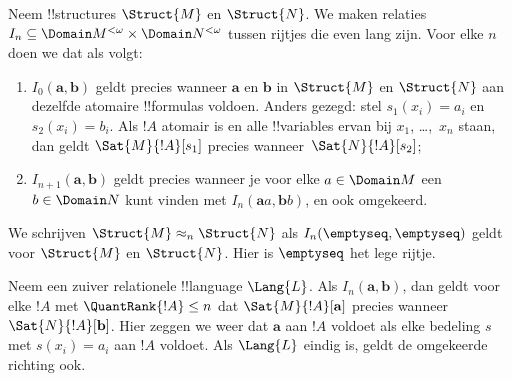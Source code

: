 \documentclass[openany]{memoir}
\begin{document}
\begin{defn}
  Neem !!{structure}s $\Struct{M}$ en $\Struct{N}$. We maken relaties
  $I_n \subseteq \Domain M^{<\omega} \times \Domain N^{<\omega}$
  tussen rijtjes die even lang zijn. Voor elke $n$ doen we dat als volgt:
   \begin{enumerate}
   \item $I_0(\mathbf{a},\mathbf{b})$ geldt precies wanneer
     $\mathbf{a}$ en $\mathbf{b}$ in $\Struct{M}$ en $\Struct{N}$
     aan dezelfde atomaire !!{formula}s voldoen. Anders gezegd: stel
     $s_1(x_i) = a_i$ en $s_2(x_i) = b_i$. Als $!A$ atomair is en alle
     !!{variable}s ervan bij $x_1$, \dots,~$x_n$ staan, dan geldt
     $\Sat{M}{!A}[s_1]$ precies wanneer~$\Sat{N}{!A}[s_2]$;
   \item $I_{n+1} (\mathbf{a},\mathbf{b})$ geldt precies wanneer je
     voor elke $a\in \Domain M$ een $b\in \Domain N$ kunt vinden met
     $I_n(\mathbf{a}a,\mathbf{b}b)$, en ook omgekeerd.
   \end{enumerate}
\end{defn}


\begin{defn}
  We schrijven $\Struct{M} \approx_n \Struct{N}$ als
  $I_n(\emptyseq,\emptyseq)$ geldt voor $\Struct{M}$ en
  $\Struct{N}$. Hier is $\emptyseq$ het lege rijtje.
\end{defn}

\begin{thm}
  Neem een zuiver relationele !!{language} $\Lang{L}$. Als
  $I_n(\mathbf{a},\mathbf{b})$, dan geldt voor elke $!A$ met
  $\QuantRank{!A} \le n$ dat $\Sat{M}{!A}[\mathbf{a}]$ precies wanneer
  $\Sat{N}{!A}[\mathbf{b}]$. Hier zeggen we weer dat $\mathbf{a}$ aan
  $!A$ voldoet als elke bedeling $s$ met $s(x_i) = a_i$ aan $!A$
  voldoet. Als $\Lang{L}$ eindig is, geldt de omgekeerde richting ook.
\end{thm}
\end{document}
